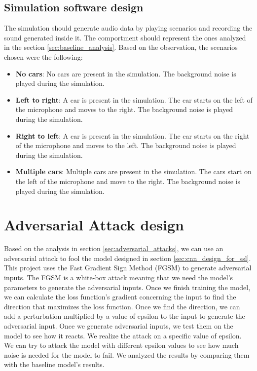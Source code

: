 \subsection{Simulation software design}

The simulation should generate audio data by playing scenarios and recording the sound generated inside it. The comportment should represent the ones analyzed in the section \ref{sec:baseline_analysis}. Based on the observation, the scenarios chosen were the following:

\begin{itemize}
    \item \textbf{No cars}: No cars are present in the simulation. The background noise is played during the simulation.
    \item \textbf{Left to right}: A car is present in the simulation. The car starts on the left of the microphone and moves to the right. The background noise is played during the simulation.
    \item \textbf{Right to left}: A car is present in the simulation. The car starts on the right of the microphone and moves to the left. The background noise is played during the simulation.
    \item \textbf{Multiple cars}: Multiple cars are present in the simulation. The cars start on the left of the microphone and move to the right. The background noise is played during the simulation.
\end{itemize}

\section{Adversarial Attack design}
\label{sec:adversarial_attack_design}

Based on the analysis in section \ref{sec:adversarial_attacks}, we can use an adversarial attack to fool the model designed in section \ref{sec:cnn_design_for_ssl}. This project uses the Fast Gradient Sign Method (FGSM) to generate adversarial inputs. The FGSM is a white-box attack meaning that we need the model's parameters to generate the adversarial inputs. Once we finish training the model, we can calculate the loss function's gradient concerning the input to find the direction that maximizes the loss function. Once we find the direction, we can add a perturbation multiplied by a value of epsilon to the input to generate the adversarial input. 
Once we generate adversarial inputs, we test them on the model to see how it reacts. We realize the attack on a specific value of epsilon. We can try to attack the model with different epsilon values to see how much noise is needed for the model to fail. We analyzed the results by comparing them with the baseline model's results.

